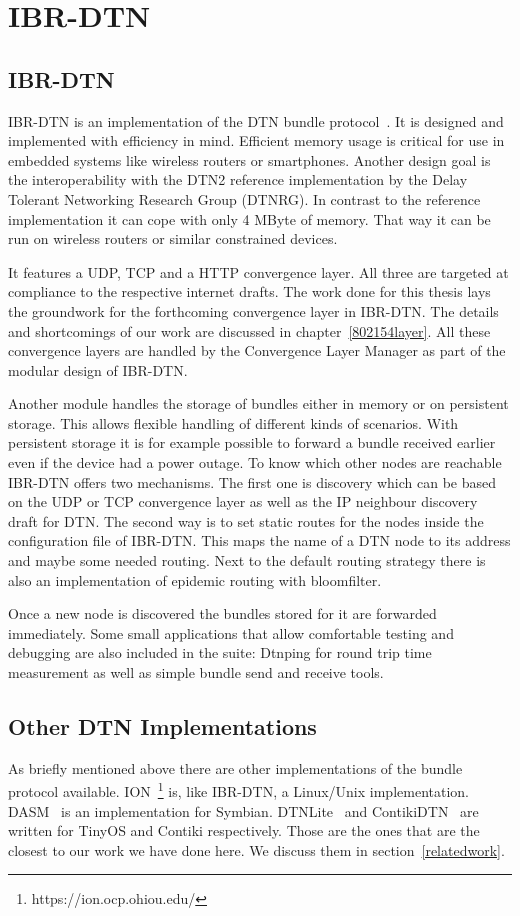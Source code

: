 \chapter{IBR-DTN}
\label{ibr-dtn}
\section{IBR-DTN}

IBR-DTN is an implementation of the DTN bundle protocol~\cite{RFC5050}. It is
designed and implemented with efficiency in mind. Efficient memory usage is critical
for use in embedded systems like wireless routers or smartphones. Another design
goal is the interoperability with the DTN2 reference implementation by the Delay
Tolerant Networking Research Group (DTNRG). In contrast to the reference
implementation it can cope with only 4 MByte of memory. That way it can be run
on wireless routers or similar constrained devices.

It features a UDP, TCP and a HTTP convergence layer. All three are targeted at
compliance to the respective internet drafts. The work done for this thesis lays
the groundwork for the forthcoming convergence layer in IBR-DTN. The details and
shortcomings of our work are discussed in chapter~\ref{802154layer}. All these
convergence layers are handled by the Convergence Layer Manager as part of the
modular design of IBR-DTN.

Another module handles the storage of bundles either in memory or on persistent
storage. This allows flexible handling of different kinds of scenarios. With
persistent storage it is for example possible to forward a bundle received earlier
even if the device had a power outage. To know which other nodes are reachable
IBR-DTN offers two mechanisms. The first one is discovery which can be based on
the UDP or TCP convergence layer as well as the IP neighbour discovery draft for
DTN. The second way is to set static routes for the nodes inside the
configuration file of IBR-DTN. This maps the name of a DTN node to its address
and maybe some needed routing. Next to the default routing strategy there is
also an implementation of epidemic routing with bloomfilter.

Once a new node is discovered the bundles stored for it are forwarded immediately.
Some small applications that allow comfortable testing and debugging are also
included in the suite: Dtnping for round trip time measurement as well as simple bundle
send and receive tools.

\section{Other DTN Implementations}

As briefly mentioned above there are other implementations of the bundle
protocol available. ION~\footnote{https://ion.ocp.ohiou.edu/} is, like IBR-DTN,
a Linux/Unix implementation. DASM~\cite{dasm} is an implementation for Symbian.
DTNLite~\cite{dtnlite} and ContikiDTN~\cite{contikidtn} are written for TinyOS and
Contiki respectively. Those are the ones that are the closest to our work we
have done here. We discuss them in section~\ref{relatedwork}.
